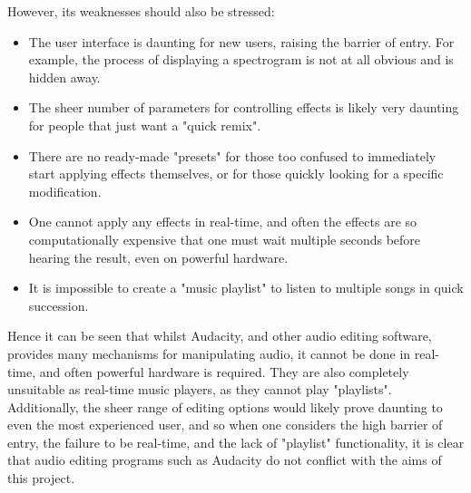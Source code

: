 \documentclass{article}
\begin{document}
	However, its weaknesses should also be stressed:
	\begin{itemize}
		\item The user interface is daunting for new users, raising the barrier of entry. For example, the process of displaying a spectrogram is not at all obvious and is hidden away.
		\item The sheer number of parameters for controlling effects is likely very daunting for people that just want a "quick remix".
		\item There are no ready-made "presets" for those too confused to immediately start applying effects themselves, or for those quickly looking for a specific modification.
		\item One cannot apply any effects in real-time, and often the effects are so computationally expensive that one must wait multiple seconds before hearing the result, even on powerful hardware.
		\item It is impossible to create a "music playlist" to listen to multiple songs in quick succession.
	\end{itemize}
	
	Hence it can be seen that whilst Audacity, and other audio editing software, provides many mechanisms for manipulating audio, it cannot be done in real-time, and often powerful hardware is required. They are also completely unsuitable as real-time music players, as they cannot play "playlists". Additionally, the sheer range of editing options would likely prove daunting to even the most experienced user, and so when one considers the high barrier of entry, the failure to be real-time, and the lack of "playlist" functionality, it is clear that audio editing programs such as Audacity do not conflict with the aims of this project.
\end{document}
